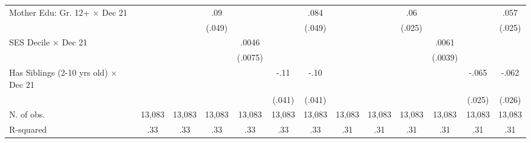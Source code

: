 \begin{table}[H]
{\begin{tabular}{lcccccccccccc}
Mother Edu: Gr. 12+ $\times$ Dec 21&                     &                     &         .09\sym{*}  &                     &                     &        .084\sym{*}  &                     &                     &         .06\sym{**} &                     &                     &        .057\sym{**} \\
                    &                     &                     &      (.049)         &                     &                     &      (.049)         &                     &                     &      (.025)         &                     &                     &      (.025)         \\
SES Decile $\times$ Dec 21&                     &                     &                     &       .0046         &                     &                     &                     &                     &                     &       .0061         &                     &                     \\
                    &                     &                     &                     &     (.0075)         &                     &                     &                     &                     &                     &     (.0039)         &                     &                     \\
Has Siblings (2-10 yrs old)     $\times$ Dec 21&                     &                     &                     &                     &        -.11\sym{**} &         -.10\sym{**} &                     &                     &                     &                     &       -.065\sym{**} &       -.062\sym{**} \\
                    &                     &                     &                     &                     &      (.041)         &      (.041)         &                     &                     &                     &                     &      (.025)         &      (.026)         \\
N. of obs.          &      13,083         &      13,083         &      13,083         &      13,083         &      13,083         &      13,083         &      13,083         &      13,083         &      13,083         &      13,083         &      13,083         &      13,083         \\
R-squared           &         .33         &         .33         &         .33         &         .33         &         .33         &         .33         &         .31         &         .31         &         .31         &         .31         &         .31         &         .31         \\
\bottomrule
\end{tabular}
}


\end{table}

